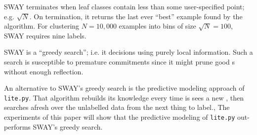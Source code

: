  SWAY terminates
when leaf classes contain less than some user-specified point; e.g. $\sqrt{N}$. 
On termination, it returns the last ever ``best'' example found by the algorithm.
For clustering $N=10,000$ examples into bins of size $\sqrt{N}=100$, SWAY requires nine labels. 


 SWAY is a ``greedy search''; i.e.  it
  decisions using purely local information.   Such a search is   susceptible to premature commitments since  it might prune good {\eg}s without
enough reflection.


An alternative to SWAY's greedy search is the 
  predictive modeling approach of   
\verb+lite.py+.
That algorithm  rebuilds its knowledge every time is sees a new {\eg}, then
searches afresh over the unlabelled data from the next thing to label.,
The experiments of this paper will show that the 
 predictive modeling of \verb+lite.py+   out-performs 
  SWAY's greedy search.







